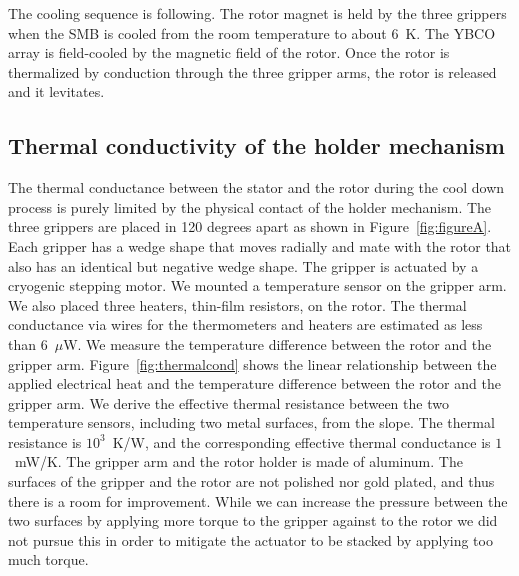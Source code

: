 \documentclass[journal]{IEEEtran}
\begin{document}
The cooling sequence is following.
The rotor magnet is held by the three grippers when the SMB is cooled from the room temperature to about 6~K.
The YBCO array is field-cooled by the magnetic field of the rotor.
Once the rotor is thermalized by conduction through the three gripper arms, the rotor is released and it levitates.

\subsection{Thermal conductivity of the holder mechanism}
The thermal conductance between the stator and the rotor during the cool down process is purely limited by the physical contact of the holder mechanism.
The three grippers are placed in 120 degrees apart as shown in Figure~\ref{fig:figureA}.
Each gripper has a wedge shape that moves radially and mate with the rotor that also has an identical but negative wedge shape.
The gripper is actuated by a cryogenic stepping motor.
We mounted a temperature sensor on the gripper arm.
We also placed three heaters, thin-film resistors, on the rotor.
The thermal conductance via wires for the thermometers and heaters are estimated as less than 6~$\mu$W.
We measure the temperature difference between the rotor and the gripper arm.
Figure~\ref{fig:thermalcond} shows the linear relationship between the applied electrical heat and the temperature difference between the rotor and the gripper arm.
We derive the effective thermal resistance between the two temperature sensors, including two metal surfaces, from the slope.
The thermal resistance is $10^{3}$~K/W, and the corresponding effective thermal conductance is $1$~mW/K.
The gripper arm and the rotor holder is made of aluminum.
The surfaces of the gripper and the rotor are not polished nor gold plated, and thus there is a room for improvement.
While we can increase the pressure between the two surfaces by applying more torque to the gripper against to the rotor we did not pursue this in order to mitigate the actuator to be stacked by applying too much torque.

\end{document}
